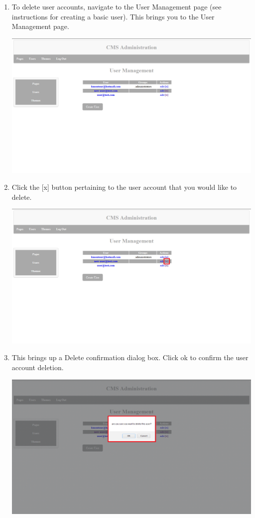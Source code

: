 \documentclass[12pt]{article}
\begin{document}
\begin{enumerate}
  \item To delete user accounts, navigate to the User Management page (see instructions for creating a basic user). This brings you to the User Management page.
  
  \includegraphics[width=\textwidth,height=\textheight,keepaspectratio]{pics/deleteUser_1.png}
  
  \item Click the [x] button pertaining to the user account that you would like to delete.
  
  \includegraphics[width=\textwidth,height=\textheight,keepaspectratio]{pics/deleteUser_2.png}
  
  \item This brings up a Delete confirmation dialog box. Click ok to confirm the user account deletion.
  
  \includegraphics[width=\textwidth,height=\textheight,keepaspectratio]{pics/deleteUser_3.png}
  

\end{enumerate}
\end{document}
